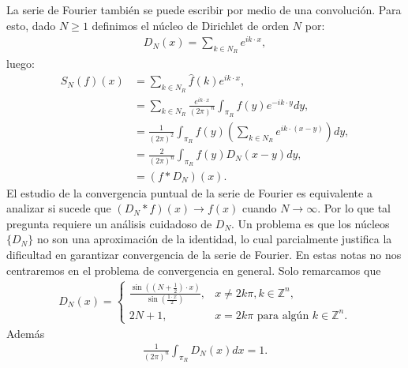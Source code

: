     La serie de Fourier también se puede escribir por medio de una convolución. Para esto, dado $N \geq 1$ definimos el núcleo de Dirichlet de orden $N$ por:
    \begin{align*}
      D_N(x)=\sum_{k\in N_R}e^{ik\cdot x},
    \end{align*}
    luego:
    \begin{align*}
      S_N(f)(x)&=\sum_{k\in N_R}\hat{f}(k)e^{ik\cdot x},\\
      &=\sum_{k\in N_R}\frac{e^{ik\cdot x}}{(2\pi)^n}\int_{\pi_R}f(y)e^{-ik\cdot y}dy,\\
      &=\frac{1}{(2\pi)^2}\int_{\pi_R}f(y)\left(\sum_{k\in N_R}e^{ik\cdot (x-y)}\right)dy,\\
      &=\frac{2}{(2\pi)^{n}}\int_{\pi_R}f(y)D_N(x-y)dy,\\
      &=(f*D_N)(x).
    \end{align*}
    El estudio de la convergencia puntual de la serie de Fourier es equivalente a analizar si sucede que $(D_N * f)(x)\to f(x)$ cuando $N\to\infty$. Por lo que tal pregunta requiere un análisis cuidadoso de $D_N$. Un problema es que los núcleos $\{D_N\}$ no son una aproximación de la identidad, lo cual parcialmente justifica la dificultad en garantizar convergencia de la serie de Fourier. En estas notas no nos centraremos en el problema de convergencia en general. Solo remarcamos que
    \begin{align*}
      D_N(x)= 
      \begin{cases}
        \frac{\sin((N+\frac{1}{2})\cdot x)}{\sin(\frac{1\cdot x}{2})}, & x\neq 2k\pi,k\in\mathbb{Z}^{n} \text{,} \\
        2N+1, &x=2k\pi \text{ para algún }k\in\mathbb{Z}^{n}.
      \end{cases}
    \end{align*}
    Además
    \begin{align*}
      \frac{1}{(2\pi)^n}\int_{\pi_R}D_N(x)dx=1.
    \end{align*}
